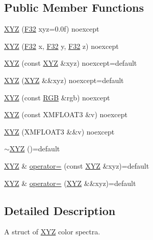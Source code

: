 \subsection*{Public Member Functions}
\begin{DoxyCompactItemize}
\item 
\hyperlink{structmage_1_1_x_y_z_a58174831ba4a113e57559dce3cd04224}{X\+YZ} (\hyperlink{namespacemage_aa97e833b45f06d60a0a9c4fc22ae02c0}{F32} xyz=0.\+0f) noexcept
\item 
\hyperlink{structmage_1_1_x_y_z_a842b9dd1624236c5699c6f57b400cbeb}{X\+YZ} (\hyperlink{namespacemage_aa97e833b45f06d60a0a9c4fc22ae02c0}{F32} x, \hyperlink{namespacemage_aa97e833b45f06d60a0a9c4fc22ae02c0}{F32} y, \hyperlink{namespacemage_aa97e833b45f06d60a0a9c4fc22ae02c0}{F32} z) noexcept
\item 
\hyperlink{structmage_1_1_x_y_z_a61e062048b12d6f08802c2b4521e3033}{X\+YZ} (const \hyperlink{structmage_1_1_x_y_z}{X\+YZ} \&xyz) noexcept=default
\item 
\hyperlink{structmage_1_1_x_y_z_ae3ff710931395e9e0b7ec3a5772138b5}{X\+YZ} (\hyperlink{structmage_1_1_x_y_z}{X\+YZ} \&\&xyz) noexcept=default
\item 
\hyperlink{structmage_1_1_x_y_z_a7502d9fa2f8d6bf59d00bcdb45c4fcd0}{X\+YZ} (const \hyperlink{structmage_1_1_r_g_b}{R\+GB} \&rgb) noexcept
\item 
\hyperlink{structmage_1_1_x_y_z_aba582d2abb3602e59cfc1f7bdcc52cbd}{X\+YZ} (const X\+M\+F\+L\+O\+A\+T3 \&v) noexcept
\item 
\hyperlink{structmage_1_1_x_y_z_a6e2f1481d1cd4763e9d82c75dd40215c}{X\+YZ} (X\+M\+F\+L\+O\+A\+T3 \&\&v) noexcept
\item 
\hyperlink{structmage_1_1_x_y_z_a07eb7ce1ad3308774b0bbad3a7f121ce}{$\sim$\+X\+YZ} ()=default
\item 
\hyperlink{structmage_1_1_x_y_z}{X\+YZ} \& \hyperlink{structmage_1_1_x_y_z_a5fab016e78603641dc590e05646e4307}{operator=} (const \hyperlink{structmage_1_1_x_y_z}{X\+YZ} \&xyz)=default
\item 
\hyperlink{structmage_1_1_x_y_z}{X\+YZ} \& \hyperlink{structmage_1_1_x_y_z_ad250bffabbd9c42cf7999165ae479ebf}{operator=} (\hyperlink{structmage_1_1_x_y_z}{X\+YZ} \&\&xyz)=default
\end{DoxyCompactItemize}


\subsection{Detailed Description}
A struct of \hyperlink{structmage_1_1_x_y_z}{X\+YZ} color spectra. 


